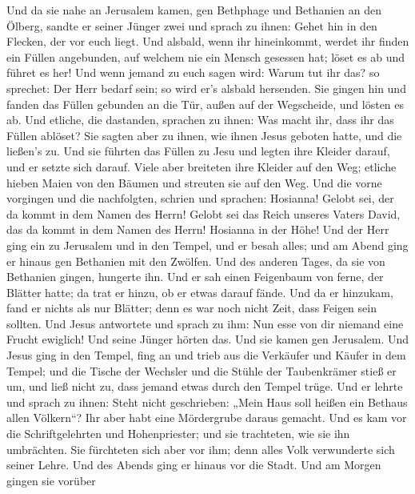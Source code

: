  Und da sie nahe an Jerusalem kamen, gen Bethphage und
Bethanien an den Ölberg, sandte er seiner Jünger zwei  und
sprach zu ihnen: Gehet hin in den Flecken, der vor euch liegt. Und
alsbald, wenn ihr hineinkommt, werdet ihr finden ein Füllen angebunden,
auf welchem nie ein Mensch gesessen hat; löset es ab und führet es her!
 Und wenn jemand zu euch sagen wird: Warum tut ihr das? so
sprechet: Der Herr bedarf sein; so wird er's alsbald hersenden.
 Sie gingen hin und fanden das Füllen gebunden an die Tür,
außen auf der Wegscheide, und lösten es ab.  Und etliche,
die dastanden, sprachen zu ihnen: Was macht ihr, dass ihr das Füllen
ablöset?  Sie sagten aber zu ihnen, wie ihnen Jesus
geboten hatte, und die ließen's zu.  Und sie führten das
Füllen zu Jesu und legten ihre Kleider darauf, und er setzte sich
darauf.  Viele aber breiteten ihre Kleider auf den Weg;
etliche hieben Maien von den Bäumen und streuten sie auf den Weg.
 Und die vorne vorgingen und die nachfolgten, schrien und
sprachen: Hosianna! Gelobt sei, der da kommt in dem Namen des Herrn!
 Gelobt sei das Reich unseres Vaters David, das da kommt
in dem Namen des Herrn! Hosianna in der Höhe!  Und der
Herr ging ein zu Jerusalem und in den Tempel, und er besah alles; und am
Abend ging er hinaus gen Bethanien mit den Zwölfen.  Und
des anderen Tages, da sie von Bethanien gingen, hungerte ihn.
 Und er sah einen Feigenbaum von ferne, der Blätter
hatte; da trat er hinzu, ob er etwas darauf fände. Und da er hinzukam,
fand er nichts als nur Blätter; denn es war noch nicht Zeit, dass Feigen
sein sollten.  Und Jesus antwortete und sprach zu ihm:
Nun esse von dir niemand eine Frucht ewiglich! Und seine Jünger hörten
das.  Und sie kamen gen Jerusalem. Und Jesus ging in den
Tempel, fing an und trieb aus die Verkäufer und Käufer in dem Tempel;
und die Tische der Wechsler und die Stühle der Taubenkrämer stieß er um,
 und ließ nicht zu, dass jemand etwas durch den Tempel
trüge.  Und er lehrte und sprach zu ihnen: Steht nicht
geschrieben: „Mein Haus soll heißen ein Bethaus allen Völkern``? Ihr
aber habt eine Mördergrube daraus gemacht.  Und es kam
vor die Schriftgelehrten und Hohenpriester; und sie trachteten, wie sie
ihn umbrächten. Sie fürchteten sich aber vor ihm; denn alles Volk
verwunderte sich seiner Lehre.  Und des Abends ging er
hinaus vor die Stadt.  Und am Morgen gingen sie vorüber
